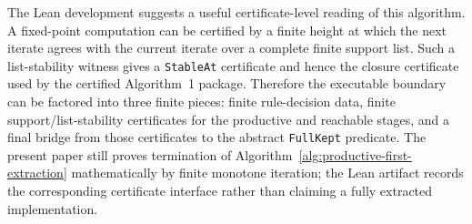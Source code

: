 \documentclass[sub]{jalc}
\begin{document}
The Lean development suggests a useful certificate-level reading of this
algorithm.  A fixed-point computation can be certified by a finite height at
which the next iterate agrees with the current iterate over a complete finite
support list.  Such a list-stability witness gives a \texttt{StableAt}
certificate and hence the closure certificate used by the certified
Algorithm~1 package.  Therefore the executable boundary can be factored into
three finite pieces: finite rule-decision data, finite support/list-stability
certificates for the productive and reachable stages, and a final bridge from
those certificates to the abstract \texttt{FullKept} predicate.  The present
paper still proves termination of Algorithm~\ref{alg:productive-first-extraction}
mathematically by finite monotone iteration; the Lean artifact records the
corresponding certificate interface rather than claiming a fully extracted
implementation.
\end{document}
